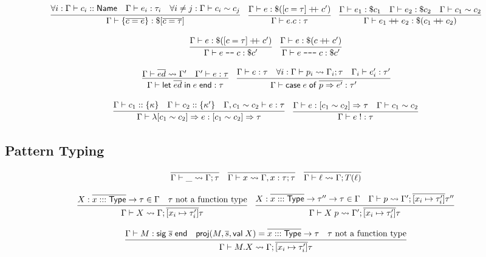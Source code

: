 \documentclass{article}
\newcommand{\mt}[1]{\mathsf{#1}}
\newcommand{\rc}{+ \hspace{-.075in} + \;}
\newcommand{\rcut}{\; \texttt{-{}-} \;}
\newcommand{\rcutM}{\; \texttt{-{}-{}-} \;}
\begin{document}
$$\infer{\Gamma \vdash \{\overline{c = e}\} : \$[\overline{c = \tau}]}{
  \forall i: \Gamma \vdash c_i :: \mt{Name}
  & \Gamma \vdash e_i : \tau_i
  & \forall i \neq j: \Gamma \vdash c_i \sim c_j
}
\quad \infer{\Gamma \vdash e.c : \tau}{
  \Gamma \vdash e : \$([c = \tau] \rc c')
}
\quad \infer{\Gamma \vdash e_1 \rc e_2 : \$(c_1 \rc c_2)}{
  \Gamma \vdash e_1 : \$c_1
  & \Gamma \vdash e_2 : \$c_2
  & \Gamma \vdash c_1 \sim c_2
}$$

$$\infer{\Gamma \vdash e \rcut c : \$c'}{
  \Gamma \vdash e : \$([c = \tau] \rc c')
}
\quad \infer{\Gamma \vdash e \rcutM c : \$c'}{
  \Gamma \vdash e : \$(c \rc c')
}$$

$$\infer{\Gamma \vdash \mt{let} \; \overline{ed} \; \mt{in} \; e \; \mt{end} : \tau}{
  \Gamma \vdash \overline{ed} \leadsto \Gamma'
  & \Gamma' \vdash e : \tau
}
\quad \infer{\Gamma \vdash \mt{case} \; e \; \mt{of} \; \overline{p \Rightarrow e'} : \tau'}{
  \Gamma \vdash e : \tau
  & \forall i: \Gamma \vdash p_i \leadsto \Gamma_i; \tau
  & \Gamma_i \vdash e_i' : \tau'
}$$

$$\infer{\Gamma \vdash \lambda [c_1 \sim c_2] \Rightarrow e : [c_1 \sim c_2] \Rightarrow \tau}{
  \Gamma \vdash c_1 :: \{\kappa\}
  & \Gamma \vdash c_2 :: \{\kappa'\}
  & \Gamma, c_1 \sim c_2 \vdash e : \tau
}
\quad \infer{\Gamma \vdash e \; ! : \tau}{
  \Gamma \vdash e : [c_1 \sim c_2] \Rightarrow \tau
  & \Gamma \vdash c_1 \sim c_2
}$$

\subsection{Pattern Typing}

$$\infer{\Gamma \vdash \_ \leadsto \Gamma; \tau}{}
\quad \infer{\Gamma \vdash x \leadsto \Gamma, x : \tau; \tau}{}
\quad \infer{\Gamma \vdash \ell \leadsto \Gamma; T(\ell)}{}$$

$$\infer{\Gamma \vdash X \leadsto \Gamma; \overline{[x_i \mapsto \tau'_i]}\tau}{
  X : \overline{x ::: \mt{Type}} \to \tau \in \Gamma
  & \textrm{$\tau$ not a function type}
}
\quad \infer{\Gamma \vdash X \; p \leadsto \Gamma'; \overline{[x_i \mapsto \tau'_i]}\tau}{
  X : \overline{x ::: \mt{Type}} \to \tau'' \to \tau \in \Gamma
  & \Gamma \vdash p \leadsto \Gamma'; \overline{[x_i \mapsto \tau'_i]}\tau''
}$$

$$\infer{\Gamma \vdash M.X \leadsto \Gamma; \overline{[x_i \mapsto \tau'_i]}\tau}{
  \Gamma \vdash M : \mt{sig} \; \overline{s} \; \mt{end}
  & \mt{proj}(M, \overline{s}, \mt{val} \; X) = \overline{x ::: \mt{Type}} \to \tau
  & \textrm{$\tau$ not a function type}
}$$
\end{document}
